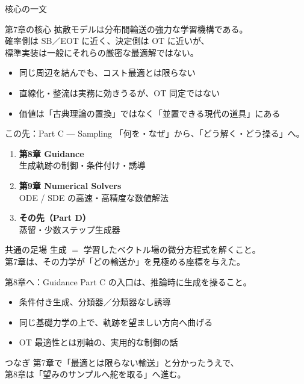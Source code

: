 \asmain
\begin{frame}{核心の一文}
    \begin{block}{第7章の核心}
        拡散モデルは分布間輸送の強力な学習機構である。\\
        確率側は SB／EOT に近く、決定側は OT に近いが、\\
        標準実装は一般にそれらの厳密な最適解ではない。
    \end{block}
    \begin{itemize}
        \item 同じ周辺を結んでも、コスト最適とは限らない
        \item 直線化・整流は実務に効きうるが、OT 同定ではない
        \item 価値は「古典理論の置換」ではなく「並置できる現代の道具」にある
    \end{itemize}
\end{frame}
\asmain
\begin{frame}{この先：Part C --- Sampling}
    「何を・なぜ」から、「どう解く・どう操る」へ。
    \begin{enumerate}
        \item \textbf{第8章 Guidance}\\
        生成軌跡の制御・条件付け・誘導
        \item \textbf{第9章 Numerical Solvers}\\
        ODE / SDE の高速・高精度な数値解法
        \item \textbf{その先（Part D）}\\
        蒸留・少数ステップ生成器
    \end{enumerate}
    \begin{exampleblock}{共通の足場}
        生成 $=$ 学習したベクトル場の微分方程式を解くこと。\\
        第7章は、その力学が「どの輸送か」を見極める座標を与えた。
    \end{exampleblock}
\end{frame}
\asmain
\begin{frame}{第8章へ：Guidance}
    Part C の入口は、推論時に生成を操ること。
    \begin{itemize}
        \item 条件付き生成、分類器／分類器なし誘導
        \item 同じ基礎力学の上で、軌跡を望ましい方向へ曲げる
        \item OT 最適性とは別軸の、実用的な制御の話
    \end{itemize}
    \begin{block}{つなぎ}
        第7章で「最適とは限らない輸送」と分かったうえで、\\
        第8章は「望みのサンプルへ舵を取る」へ進む。
    \end{block}
\end{frame}

